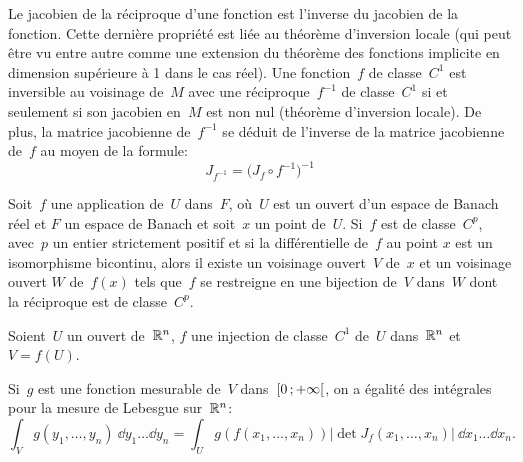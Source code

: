 \medskipvm
Le jacobien de la réciproque d'une fonction est l'inverse du jacobien de la fonction.
\medskipvm
{}
Cette dernière propriété est liée au théorème d'inversion locale (qui peut être vu entre autre comme une extension du théorème des fonctions implicite en dimension supérieure à 1 dans le cas réel).
\medskipvm
Une fonction~$f$ de classe~$C^1$ est inversible au voisinage de~$M$ avec une réciproque~$f^{-1}$ de classe~$C^1$ si et seulement si son jacobien en~$M$ est non nul (théorème d'inversion locale). De plus, la matrice jacobienne de~$f^{-1}$ se déduit de l'inverse de la matrice jacobienne de~$f$ au moyen de la formule:
\begin{equation}J_{f^{-1}} = \bigl( J_f \circ f^{-1} \bigr)^{-1}\end{equation}

\begin{theoreme}
Soit~$f$ une application de~$U$ dans~$F$, où~$U$ est un ouvert d'un espace de Banach réel et $F$ un espace de Banach et soit~$x$ un point de~$U$.
Si~$f$ est de classe~$C^p$, avec~$p$ un entier strictement positif et si la différentielle de~$f$ au point $x$ est un isomorphisme bicontinu, alors il existe un voisinage ouvert~$V$ de~$x$ et un voisinage ouvert $W$ de~$f(x)$ tels que~$f$ se restreigne en une bijection de~$V$ dans~$W$ dont la réciproque est de classe~$C^p$.
\end{theoreme}
\medskipvm
{}
\medskipvm
\begin{theoreme}
Soient~$U$ un ouvert de~$\mathbb R^n$, $f$ une injection de classe~$C^1$ de~$U$ dans~$\mathbb R^n$ et~$V=f(U)$.

Si~$g$ est une fonction mesurable de~$V$ dans~$\mathopen{[}0\,;+\infty\mathclose{[}$, on a égalité des intégrales pour la mesure de Lebesgue sur~$\mathbb R^n$:
\begin{equation}  \int_V g(y_1,\ldots,y_n)~\dd y_1\ldots\dd y_n = \int_U g\left(f\left(x_1,\ldots,x_n\right)\right) 
\left|\det J_f(x_1,\ldots,x_n)\right|~\dd x_1\ldots\dd x_n.
\end{equation}
\end{theoreme}
\medskipvm
{}

